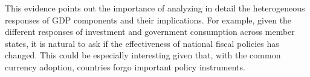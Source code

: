 \documentclass[12pt]{article}
\begin{document}
This evidence points out the importance of analyzing in detail the heterogeneous responses of GDP components and their implications. For example, given the different responses of investment and government consumption across member states, it is natural to ask if the effectiveness of national fiscal policies has changed. This could be especially interesting given that, with the common currency adoption, countries forgo important policy instruments.




\clearpage
\singlespace



\clearpage
\end{document}
